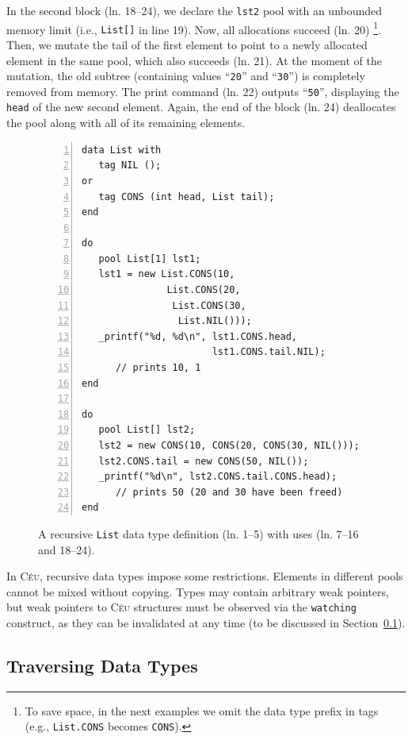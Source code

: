 \documentclass{sig-alternate}
\newcommand{\CEU}{\textsc{C\'{e}u}\xspace}
\newcommand{\code}[1] {{\small{\texttt{#1}}}}
\begin{document}
In the second block (ln. 18--24), we declare the \code{lst2} pool with an 
unbounded memory limit (i.e., \code{List[]} in line 19).
Now, all allocations succeed (ln. 20)%
\footnote{To save space, in the next examples we omit the data type prefix in 
tags (e.g., \code{List.CONS} becomes \code{CONS}).}.
Then, we mutate the tail of the first element to point to a newly allocated 
element in the same pool, which also succeeds (ln. 21).
At the moment of the mutation, the old subtree (containing values  
``\texttt{20}'' and  ``\texttt{30}'') is completely removed from memory.
The print command (ln. 22) outputs ``\texttt{50}'', displaying the \code{head}
of the new second element.
%
Again, the end of the block (ln. 24) deallocates the pool along with all of its 
remaining elements.


\begin{figure}[t]
\begin{lstlisting}[numbers=left,xleftmargin=3em]
data List with
   tag NIL ();
or
   tag CONS (int head, List tail);
end

do
   pool List[1] lst1;
   lst1 = new List.CONS(10,
               List.CONS(20,
                List.CONS(30,
                 List.NIL()));
   _printf("%d, %d\n", lst1.CONS.head,
                       lst1.CONS.tail.NIL);
      // prints 10, 1
end

do
   pool List[] lst2;
   lst2 = new CONS(10, CONS(20, CONS(30, NIL()));
   lst2.CONS.tail = new CONS(50, NIL());
   _printf("%d\n", lst2.CONS.tail.CONS.head);
      // prints 50 (20 and 30 have been freed)
end
\end{lstlisting}
\caption{
A recursive \code{List} data type definition (ln. 1--5) with uses (ln. 
7--16 and 18--24).
\label{lst.list}
}
\end{figure}

In \CEU, recursive data types impose some restrictions.
Elements in different pools cannot be mixed without copying.
Types may contain arbitrary weak pointers, but weak pointers to \CEU
structures must be observed via the
\code{watching} construct, as they can be invalidated at any time
(to be discussed in Section~\ref{sec.traverse}).


\subsection{Traversing Data Types}
\label{sec.traverse}
\end{document}

